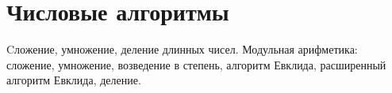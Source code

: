 \section{Числовые алгоритмы}
Cложение, умножение, деление длинных чисел.
Модульная арифметика: сложение, умножение,
возведение в степень, алгоритм Евклида,
расширенный алгоритм Евклида, деление.

